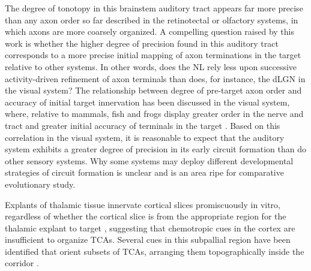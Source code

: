 The degree of tonotopy in this brainstem auditory tract appears far more precise than any axon order so far described in the retinotectal or olfactory systems, in which axons are more coarsely organized. 
A compelling question raised by this work is whether the higher degree of precision found in this auditory tract corresponds to a more precise initial mapping of axon terminations in the target relative to other systems. 
In other words, does the NL rely less upon successive activity-driven refinement of axon terminals than does, for instance, the dLGN in the visual system? 
The relationship between degree of pre-target axon order and accuracy of initial target innervation has been discussed in the visual system, where, relative to mammals, fish and frogs display greater order in the nerve and tract and greater initial accuracy of terminals in the target \cite{simon1991relationship}. 
Based on this correlation in the visual system, it is reasonable to expect that the auditory system exhibits a greater degree of precision in its early circuit formation than do other sensory systems. 
Why some systems may deploy different developmental strategies of circuit formation is unclear and is an area ripe for comparative evolutionary study. 


Explants of thalamic tissue innervate cortical slices promiscuously in vitro, regardless of whether the cortical slice is from the appropriate region for the thalamic explant to target \cite{molnar1991lack}, suggesting that chemotropic cues in the cortex are insufficient to organize TCAs. 
Several cues in this subpallial region have been identified that orient subsets of TCAs, arranging them topographically inside the corridor \cite{dufour2003area,powell2008topography,seibt2003neurogenin2}. 

